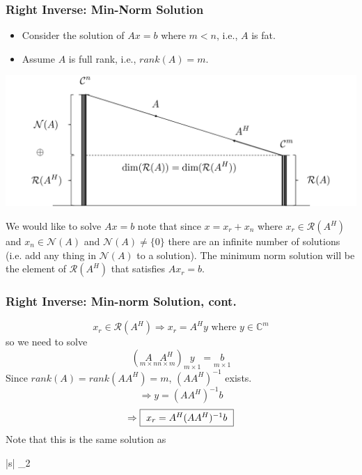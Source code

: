 \documentclass{beamer}
\begin{document}
\begin{frame}\frametitle{Right Inverse: Min-Norm Solution}
	\begin{itemize}
		\item 	Consider the solution of $Ax=b$ where $m<n$, i.e., $A$ is fat.
		\item Assume $A$ is full rank, i.e., $rank(A)=m$.
	\end{itemize}
	\begin{center}
		\includegraphics[width=\textwidth]{figures/chap4_min_norm}
	\end{center}
	
	We would like to solve $Ax = b$ note that since $x = x_r + x_n$ where $x_r \in \mathcal{R}(A^H)$ and $x_n \in \mathcal{N}(A)$ and $\mathcal{N}(A) \neq \{0\}$ there are an infinite number of solutions (i.e. add any thing in $\mathcal{N}(A)$ to a solution).  
	The minimum norm solution will be the element of $\mathcal{R}(A^H)$ that satisfies $Ax_r = b$.
\end{frame}

\begin{frame}\frametitle{Right Inverse: Min-norm Solution, cont.}
	\[ x_r \in \mathcal{R}(A^H) \Rightarrow x_r = A^Hy \text{ where } y \in \mathbb{C}^m \]
	so we need to solve
	\[ (\underset{m\times n}{A}\underset{n\times m}{A^H})\underset{m\times 1}{y} = \underset{m \times 1}{b} \]
	Since $rank(A) = rank(AA^H) = m$, $(AA^H)^{-1}$ exists.
	\[ \Rightarrow y = (AA^H)^{-1}b \]
	\[ \Rightarrow \fbox{ $x_r = A^H(AA^H)^{-1}b$ } \]
	Note that this is the same solution as
		\begin{mini*}|s|
		{}{_2}{}{}
		\end{mini*}
\end{frame}
\end{document}
